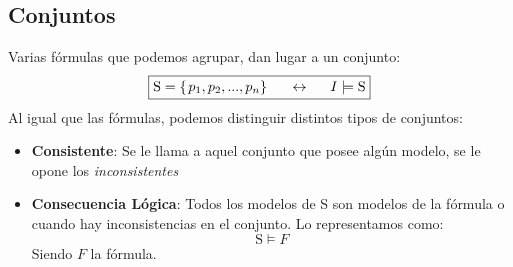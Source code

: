 \subsection{Conjuntos}
\noindent Varias fórmulas que podemos agrupar, dan lugar a un conjunto:
\[
        \boxed{\mathrm{S} = \left \{ \left. p_1, p_2, ..., p_n \right \} \right. \hspace{.5cm} \leftrightarrow \hspace{.5cm} I \models {\mathrm{S}}}
\]
\noindent Al igual que las fórmulas, podemos distinguir distintos tipos de conjuntos:
\begin{itemize}
        \item \textbf{Consistente}: Se le llama a aquel conjunto que posee algún modelo, se le opone los \textit{inconsistentes}
        \item \textbf{Consecuencia Lógica}: Todos los modelos de S son modelos de la fórmula o cuando hay inconsistencias en el conjunto. Lo representamos como:
              \[
                      \boxed{\mathrm{S} \models F}
              \]
              \noindent Siendo \(F\) la fórmula.
\end{itemize}